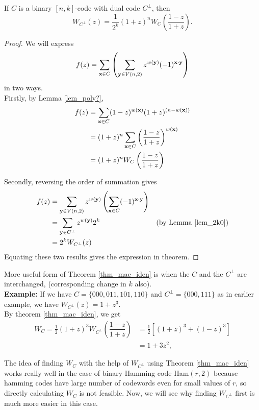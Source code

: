 \documentclass[../main.tex]{subfiles}
\begin{document}
\begin{thm}\label{thm_mac_iden}
	If $C$ is a binary $[n,k]$-code with dual code $C^\perp$, then
	\[
		W_{C^\perp}(z) = \dfrac{1}{2^k}(1+z)^n W_C \left( \dfrac{1-z}{1+z} \right).
	\]	
	
\end{thm}
\begin{proof}
	We will express 
	\[
		f(z) = \sum_{\textbf{x} \in C} \left( \sum_{\textbf{y} \in V(n,2)} z^{w(\textbf{y})}(-1)^{\textbf{x}\cdot \textbf{y}} \right)
	\]
	in two ways.\\
	Firstly, by Lemma \ref{lem_poly?},
	\begin{align*}
		f(z) &= \sum_{\textbf{x} \in C} (1-z)^{w(\textbf{x})}(1+z)^{(n-w(\textbf{x}))} \\
		&= (1+z)^n \sum_{\textbf{x} \in C} \left( \dfrac{1-z}{1+z} \right)^{w(\textbf{x})} \\
		&= (1+z)^n W_C \left( \dfrac{1-z}{1+z} \right)	
	\end{align*}	
	
	Secondly, reversing the order of summation gives
	\begin{align*}
		f(z) &= \sum_{\textbf{y} \in V(n,2)} z^{w(\textbf{y})} \left( \sum_{\textbf{x} \in C} (-1)^{\textbf{x}\cdot \textbf{y}} \right) \\
		&= \sum_{\textbf{y} \in C^\perp} z^{w(\textbf{y})}2^k & \text{(by Lemma \ref{lem_2k0})} \\
		&= 2^k W_{C^\perp}(z) \\
	\end{align*}
	Equating these two results gives the expression in theorem.	 
\end{proof}

More useful form of Theorem \ref{thm_mac_iden} is when the $C$ and the $C^\perp$ are interchanged, (corresponding change in $k$ also).\\

\textbf{Example:} If we have $C = \{ 000,011,101,110 \}$ and $C^{\perp} =\{ 000,111 \}$ as in earlier example, we have $W_{C^\perp}(z) = 1 + z^3$.\\
By theorem \ref{thm_mac_iden}, we get
\begin{align*}
	W_{C} = \frac{1}{2}(1+z)^3 W_{C^\perp} \left( \dfrac{1-z}{1+z} \right) &= \frac{1}{2} [ (1+z)^3 + (1-z)^3]\\
	& = 1 + 3z^2,
\end{align*}

The idea of finding $W_{C}$ with the help of $W_{C^\perp}$ using Theorem \ref{thm_mac_iden} works really well in the case of binary Hamming code Ham$(r,2)$ because hamming codes have large number of codewords even for small values of $r$, so directly calculating $W_{C}$ is not feasible. Now, we will see why finding $W_{C^\perp}$ first is much more easier in this case.
\end{document}
